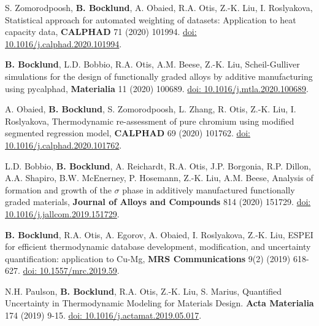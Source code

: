 \item S. Zomorodpoosh, \textbf{B. Bocklund}, A. Obaied, R.A. Otis, Z.-K. Liu, I. Roslyakova,
Statistical approach for automated weighting of datasets: Application to heat capacity data,
  \textbf{CALPHAD} 71 (2020) 101994.
  \href{https://doi.org/10.1016/j.calphad.2020.101994}{doi: 10.1016/j.calphad.2020.101994}.

\item \textbf{B. Bocklund}, L.D. Bobbio, R.A. Otis, A.M. Beese, Z.-K. Liu,
Scheil-Gulliver simulations for the design of functionally graded alloys by additive manufacturing using pycalphad,
  \textbf{Materialia} 11 (2020) 100689.
  \href{https://doi.org/10.1016/j.mtla.2020.100689}{doi: 10.1016/j.mtla.2020.100689}.

\item A. Obaied, \textbf{B. Bocklund}, S. Zomorodpoosh, L. Zhang, R. Otis, Z.-K. Liu, I. Roslyakova,
  Thermodynamic re-assessment of pure chromium using modified segmented regression model,
  \textbf{CALPHAD} 69 (2020) 101762.
  \href{https://doi.org/10.1016/j.calphad.2020.101762}{doi: 10.1016/j.calphad.2020.101762}.

\item L.D. Bobbio, \textbf{B. Bocklund}, A. Reichardt, R.A. Otis, J.P. Borgonia, R.P. Dillon, A.A. Shapiro, B.W. McEnerney, P. Hosemann, Z.-K. Liu, A.M. Beese,
  Analysis of formation and growth of the $ \sigma $ phase in additively manufactured functionally graded materials,
  \textbf{Journal of Alloys and Compounds} 814 (2020) 151729.
  \href{https://doi.org/10.1016/j.jallcom.2019.151729}{doi: 10.1016/j.jallcom.2019.151729}.

\item \textbf{B. Bocklund}, R.A. Otis, A. Egorov, A. Obaied, I. Roslyakova, Z.-K. Liu,
  ESPEI for efficient thermodynamic database development, modification, and uncertainty quantification: application to Cu-Mg,
  \textbf{MRS Communications} 9(2) (2019) 618-627.
  \href{https://doi.org/10.1557/mrc.2019.59}{doi: 10.1557/mrc.2019.59}.

\item N.H. Paulson, \textbf{B. Bocklund}, R.A. Otis, Z.-K. Liu, S. Marius,
  Quantified Uncertainty in Thermodynamic Modeling for Materials Design.
  \textbf{Acta Materialia} 174 (2019) 9-15.
  \href{https://doi.org/10.1016/j.actamat.2019.05.017}{doi: 10.1016/j.actamat.2019.05.017}.

